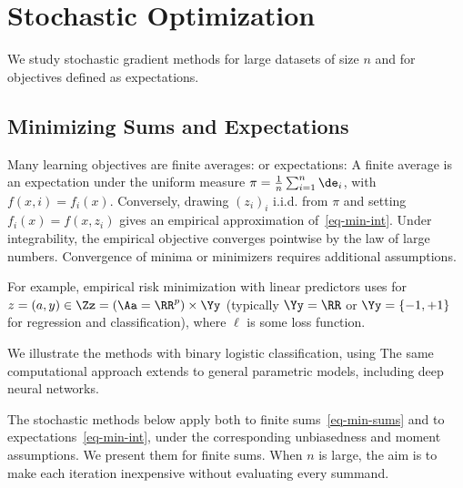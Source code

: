 \section{Stochastic Optimization}
\label{sec-stochastic-optim}

We study stochastic gradient methods for large datasets of size $n$ and for objectives defined as expectations.

                                                                                                                                                                  

                                                        
\subsection{Minimizing Sums and Expectations}

Many learning objectives are finite averages:
or expectations:
A finite average is an expectation under the uniform measure $\pi=\frac1n\sum_{i=1}^n\de_i$, with $f(x,i)=f_i(x)$. Conversely, drawing $(z_i)_i$ i.i.d. from $\pi$ and setting $f_i(x)=f(x,z_i)$ gives an empirical approximation of~\eqref{eq-min-int}. Under integrability, the empirical objective converges pointwise by the law of large numbers. Convergence of minima or minimizers requires additional assumptions.

For example, empirical risk minimization with linear predictors uses
for $z=(a,y) \in \Zz = (\Aa=\RR^p) \times \Yy$ (typically $\Yy=\RR$ or $\Yy=\{-1,+1\}$ for regression and classification), where $\ell$ is some loss function. 
 
We illustrate the methods with binary logistic classification, using
The same computational approach extends to general parametric models, including deep neural networks.

The stochastic methods below apply both to finite sums~\eqref{eq-min-sums} and to expectations~\eqref{eq-min-int}, under the corresponding unbiasedness and moment assumptions. We present them for finite sums. When $n$ is large, the aim is to make each iteration inexpensive without evaluating every summand.

